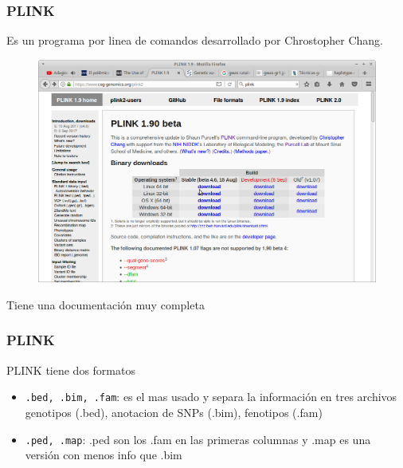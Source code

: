 \documentclass{beamer}\usepackage[]{graphicx}\usepackage[]{color}
\begin{document}
\begin{frame}[fragile]
\frametitle{PLINK}
Es un programa por linea de comandos desarrollado por Chrostopher Chang.

\begin{figure}[htbp]
\begin{center}
\includegraphics[width=.8\linewidth]{plink.png}
\end{center}
\end{figure}

Tiene una documentaci\'on muy completa
\end{frame}


\begin{frame}[fragile]
\frametitle{PLINK}
PLINK tiene dos formatos
\begin{itemize}
\item {\tt .bed, .bim, .fam}: es el mas usado y separa la informaci\'on en tres archivos genotipos (.bed), anotacion de SNPs (.bim), fenotipos (.fam)  

\item {\tt .ped, .map}: .ped son los .fam en las primeras columnas y .map es una versi\'on con menos info que .bim
 
\end{itemize}
\end{frame}
\end{document}
